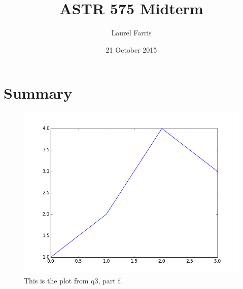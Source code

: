 \documentclass{article}
\title{ASTR 575 Midterm}
\author{Laurel Farris}
\date{21 October 2015}
\begin{document}
\maketitle

\section{Summary}



\begin{figure}[h]
  \centering
  \includegraphics[width=5.0in]{../q3/figure_1.png}
  \caption{This is the plot from q3, part f.}
  \label{accuracy}
\end{figure}
\end{document}
